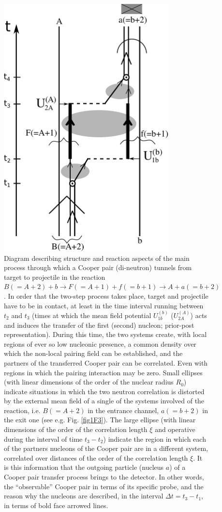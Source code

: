     \begin{figure}
    \centerline{\includegraphics*[width=9cm,angle=0]{C8/figsC8/Fig8_v2}}
    	\caption{Diagram describing structure and reaction aspects of the main process through which a Cooper pair (di-neutron) tunnels from target to projectile in the reaction $B(=A+2)+b\to F(=A+1)+f(=b+1)\to A+a(=b+2)$. In order that the two-step process  takes place, target and projectile have to be in contact, at least in the time interval running between $t_2$ and $t_3$ (times at which the mean field potential $U_{1b}^{(b)}$ ($U_{2A}^{(A)}$) acts and induces the transfer of the first (second) nucleon; prior-post representation). During this time, the two systems create, with local regions of ever so low nucleonic presence, a common density over which the non-local pairing field can be established, and the partners of the transferred Cooper pair can be correlated. Even with regions in which the pairing interaction may be zero. Small ellipses (with linear dimensions of the order of the nuclear radius $R_0$) indicate situations in which the two neutron correlation is distorted by the external mean field of a single of the systems involved of the reaction, i.e. $B(=A+2)$ in the entrance channel, $a(=b+2)$ in the exit one (see e.g. Fig. \ref{fig1F3}). The large ellipse (with linear dimensions of the order of the correlation length $\xi$ and operative during the interval of time $t_3-t_2$) indicate the region in which each of the partners nucleons  of the Cooper pair are in a different system, correlated over distances of the order of the correlation length $\xi$. It is this information that the outgoing particle (nucleus $a$) of a Cooper pair transfer process brings to the detector. In other words, the ``observable'' Cooper pair in terms of its specific probe, and the reason why the nucleons are described, in the interval $\Delta t=t_3-t_1$, in terms of bold face arrowed lines.}\label{fig6.5.5}
    \end{figure}
